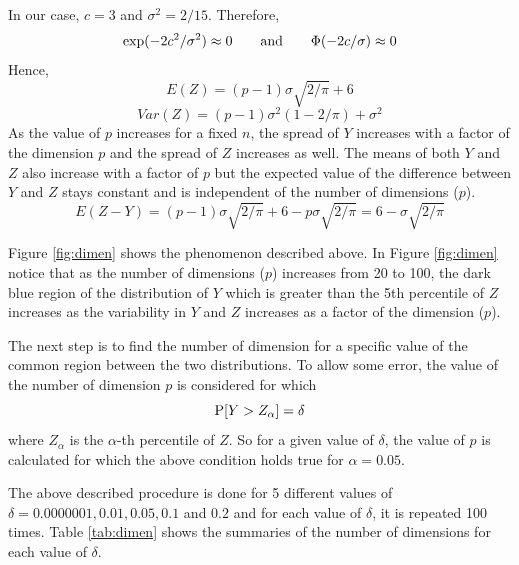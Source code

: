 In our case, $c = 3$ and $\sigma^2 = 2/15$. Therefore,
$$\exp(- 2c^2/\sigma^2) \approx 0 \qquad \hbox{and} \qquad \Phi(-2c/\sigma) \approx 0$$
Hence,
$$E(Z) = (p - 1) \sigma \sqrt{2/\pi} + 6$$
$$Var(Z) = (p - 1)\sigma^2 (1 - 2/\pi) + \sigma^2$$
As the value of $p$ increases for a fixed $n$, the spread of $Y$ increases with a factor of the dimension $p$ and the spread of $Z$ increases as well. The means of both $Y$ and $Z$ also increase with a factor of $p$ but the expected value of the difference between $Y$ and $Z$ stays constant and is independent of the number of dimensions ($p$). 
$$E (Z - Y) = (p - 1) \sigma \sqrt{2/\pi} + 6 - p \sigma \sqrt{2/\pi} = 6 - \sigma \sqrt{2/\pi}$$


 Figure \ref{fig:dimen} shows the phenomenon described above. In Figure \ref{fig:dimen} notice that as the number of dimensions ($p$) increases from 20 to 100, the dark blue region of the distribution of $Y$ which is greater than the 5th percentile of $Z$ increases as the variability in $Y$ and $Z$ increases as a factor of the dimension ($p$).


The next step is to find the number of dimension for a specific value of the common region between the two distributions. To allow some error, the value of the number of dimension $p$ is considered for which $$\hbox{P}[Y > Z_{\alpha}] = \delta$$ where $Z_{\alpha}$ is the $\alpha$-th percentile of $Z$.  So for a given value of $\delta$,  the value of $p$ is calculated for which the above condition holds true for $\alpha = 0.05$.

The above described procedure is done for 5 different values of $\delta  = 0.0000001, 0.01, 0.05, 0.1$ and $0.2$ and for each value of $\delta$, it is repeated 100 times. Table \ref{tab:dimen} shows the summaries of the number of dimensions for each value of $\delta$.

